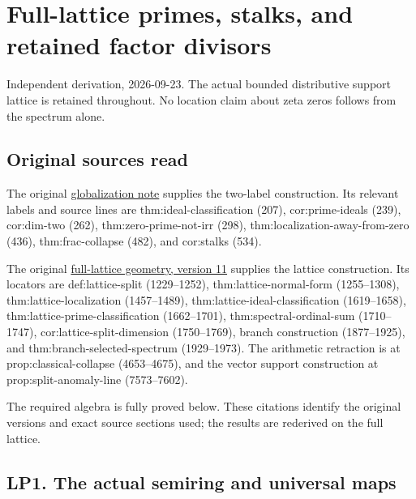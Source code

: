 \section{Full-lattice primes, stalks, and retained factor
divisors}\label{full-lattice-primes-stalks-and-retained-factor-divisors}

Independent derivation, 2026-09-23. The actual bounded distributive
support lattice is retained throughout. No location claim about zeta
zeros follows from the spectrum alone.

\subsection{Original sources read}\label{original-sources-read}

The original
\href{https://github.com/KokunoYumeto/zeta-function-research-reader/blob/d2f0020a7c446f429682925c1c682d99ba86a4cc/workbenches/splitzero-tandem/foundations/globalization-semiring/globalization_note.tex}{globalization
note} supplies the two-label construction. Its relevant labels and
source lines are thm:ideal-classification (207), cor:prime-ideals (239),
cor:dim-two (262), thm:zero-prime-not-irr (298),
thm:localization-away-from-zero (436), thm:frac-collapse (482), and
cor:stalks (534).

The original
\href{https://github.com/KokunoYumeto/zeta-function-research-reader/blob/a2851f9eb352e7e4376bc629de86fa4ed9c1c434/workbenches/splitzero-tandem/foundations/split-support-geometry-v11/split_support_geometry_arithmetic_curve_v11.tex}{full-lattice
geometry, version 11} supplies the lattice construction. Its locators
are def:lattice-split (1229--1252), thm:lattice-normal-form
(1255--1308), thm:lattice-localization (1457--1489),
thm:lattice-ideal-classification (1619--1658),
thm:lattice-prime-classification (1662--1701), thm:spectral-ordinal-sum
(1710--1747), cor:lattice-split-dimension (1750--1769), branch
construction (1877--1925), and thm:branch-selected-spectrum
(1929--1973). The arithmetic retraction is at prop:classical-collapse
(4653--4675), and the vector support construction at
prop:split-anomaly-line (7573--7602).

The required algebra is fully proved below. These citations identify the
original versions and exact source sections used; the results are
rederived on the full lattice.

\subsection{LP1. The actual semiring and universal
maps}\label{lp1.-the-actual-semiring-and-universal-maps}

